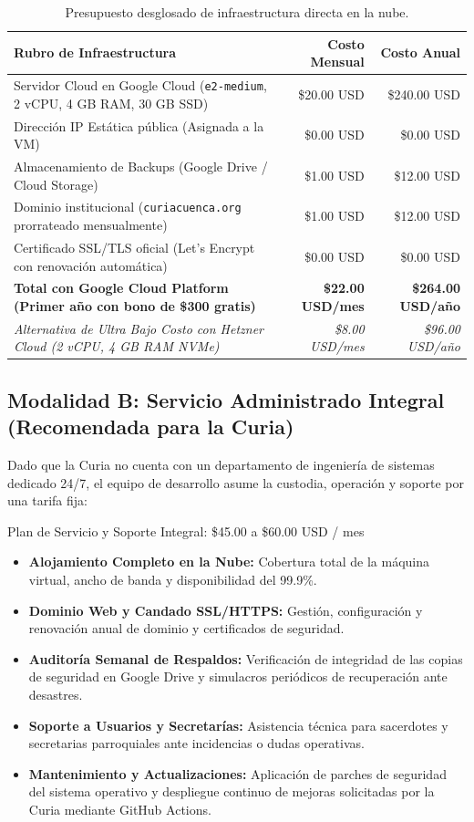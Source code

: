 \documentclass[11pt,a4paper]{article}
\begin{document}
\begin{table}[h!]
\centering
\small
\begin{tabularx}{0.95\textwidth}{X r r}
\toprule
\textbf{Rubro de Infraestructura} & \textbf{Costo Mensual} & \textbf{Costo Anual} \\
\midrule
Servidor Cloud en Google Cloud (\texttt{e2-medium}, 2 vCPU, 4 GB RAM, 30 GB SSD) & \$20.00 USD & \$240.00 USD \\
Dirección IP Estática pública (Asignada a la VM) & \$0.00 USD & \$0.00 USD \\
Almacenamiento de Backups (Google Drive / Cloud Storage) & \$1.00 USD & \$12.00 USD \\
Dominio institucional (\texttt{curiacuenca.org} prorrateado mensualmente) & \$1.00 USD & \$12.00 USD \\
Certificado SSL/TLS oficial (Let's Encrypt con renovación automática) & \$0.00 USD & \$0.00 USD \\
\midrule
\textbf{Total con Google Cloud Platform (Primer año con bono de \$300 gratis)} & \textbf{\$22.00 USD/mes} & \textbf{\$264.00 USD/año} \\
\midrule
\textit{Alternativa de Ultra Bajo Costo con Hetzner Cloud (2 vCPU, 4 GB RAM NVMe)} & \textit{\$8.00 USD/mes} & \textit{\$96.00 USD/año} \\
\bottomrule
\end{tabularx}
\caption{Presupuesto desglosado de infraestructura directa en la nube.}
\end{table}

\subsection{Modalidad B: Servicio Administrado Integral (Recomendada para la Curia)}
Dado que la Curia no cuenta con un departamento de ingeniería de sistemas dedicado 24/7, el equipo de desarrollo asume la custodia, operación y soporte por una tarifa fija:

\begin{destacadobox}{Plan de Servicio y Soporte Integral: \$45.00 a \$60.00 USD / mes}
\begin{itemize}[leftmargin=1cm]
    \item \textbf{Alojamiento Completo en la Nube:} Cobertura total de la máquina virtual, ancho de banda y disponibilidad del 99.9\%.
    \item \textbf{Dominio Web y Candado SSL/HTTPS:} Gestión, configuración y renovación anual de dominio y certificados de seguridad.
    \item \textbf{Auditoría Semanal de Respaldos:} Verificación de integridad de las copias de seguridad en Google Drive y simulacros periódicos de recuperación ante desastres.
    \item \textbf{Soporte a Usuarios y Secretarías:} Asistencia técnica para sacerdotes y secretarias parroquiales ante incidencias o dudas operativas.
    \item \textbf{Mantenimiento y Actualizaciones:} Aplicación de parches de seguridad del sistema operativo y despliegue continuo de mejoras solicitadas por la Curia mediante GitHub Actions.
\end{itemize}
\end{destacadobox}
\end{document}
